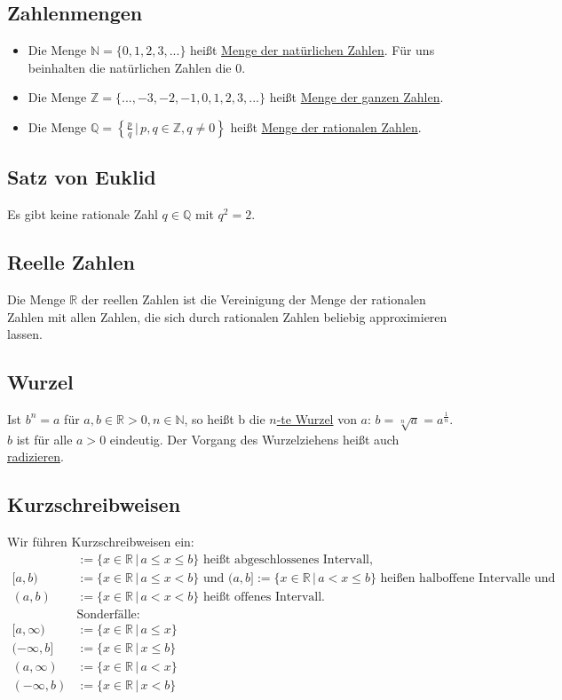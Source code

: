 \subsection{Zahlenmengen}
\begin{itemize}
\item{Die Menge $\mathbb{N} = \{0,1,2,3,...\}$ heißt \underline{Menge der natürlichen Zahlen}. Für uns beinhalten die natürlichen Zahlen die $0$.}
\item{Die Menge $\mathbb{Z} = \{...,-3,-2,-1,0,1,2,3,...\}$ heißt \underline{Menge der ganzen Zahlen}.}
\item{Die Menge $\mathbb{Q} = \left\{\frac{p}{q}\,|\,p,q \in \mathbb{Z}, q \neq 0\right\}$ heißt \underline{Menge der rationalen Zahlen}.}
\end{itemize}

\subsection{Satz von Euklid}
Es gibt keine rationale Zahl $q \in \mathbb{Q}$ mit $q^2 = 2$.

\subsection{Reelle Zahlen}
Die Menge $\mathbb{R}$ der reellen Zahlen ist die Vereinigung der Menge der rationalen Zahlen mit allen Zahlen, die sich durch rationalen Zahlen beliebig approximieren lassen.

\subsection{Wurzel}
Ist $b^n = a$ für $a, b \in \mathbb{R} > 0, n \in \mathbb{N}$, so heißt b die \underline{$n$-te Wurzel} von $a$: $b = \sqrt[n]{a}=a^\frac{1}{n}$. $b$ ist für alle $a > 0$ eindeutig. Der Vorgang des Wurzelziehens heißt auch \underline{radizieren}.

\subsection{Kurzschreibweisen}
Wir führen Kurzschreibweisen ein:
\begin{align*}
[a,b] &:= \{x\in\mathbb{R}\,|\,a \leq x \leq b\}\text{ heißt abgeschlossenes Intervall,} \\
[a,b) &:= \{x\in\mathbb{R}\,|\,a \leq x < b\}\text{ und }(a,b] := \{x\in\mathbb{R}\,|\,a < x \leq b\}\text{ heißen halboffene Intervalle und} \\
(a,b) &:= \{x\in\mathbb{R}\,|\,a < x < b\}\text{ heißt offenes Intervall.} \\
&\text{Sonderfälle:} \\
[a, \infty) &:= \{x\in\mathbb{R}\,|\,a \leq x\} \\
(-\infty, b] &:= \{x\in\mathbb{R}\,|\,x \leq b\} \\
(a, \infty) &:= \{x\in\mathbb{R}\,|\,a < x\} \\
(-\infty, b) &:= \{x\in\mathbb{R}\,|\,x < b\}
\end{align*}

